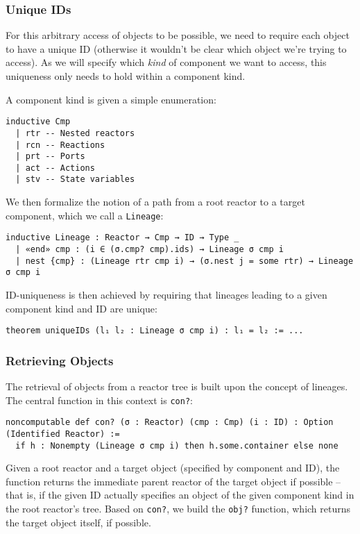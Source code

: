 \subsubsection{Unique IDs}

For this arbitrary access of objects to be possible, we need to require each object to have a unique ID (otherwise it wouldn't be clear which object we're trying to access).
As we will specify which \emph{kind} of component we want to access, this uniqueness only needs to hold within a component kind.

A component kind is given a simple enumeration:

\begin{lstlisting}
inductive Cmp
  | rtr -- Nested reactors
  | rcn -- Reactions
  | prt -- Ports
  | act -- Actions
  | stv -- State variables
\end{lstlisting}

We then formalize the notion of a path from a root reactor to a target component, which we call a \lstinline{Lineage}:

\begin{lstlisting}
inductive Lineage : Reactor → Cmp → ID → Type _
  | «end» cmp : (i ∈ (σ.cmp? cmp).ids) → Lineage σ cmp i
  | nest {cmp} : (Lineage rtr cmp i) → (σ.nest j = some rtr) → Lineage σ cmp i
\end{lstlisting}

ID-uniqueness is then achieved by requiring that lineages leading to a given component kind and ID are unique:

\begin{lstlisting}
theorem uniqueIDs (l₁ l₂ : Lineage σ cmp i) : l₁ = l₂ := ...
\end{lstlisting}

\subsubsection{Retrieving Objects}

The retrieval of objects from a reactor tree is built upon the concept of lineages.
The central function in this context is \lstinline{con?}:

\begin{lstlisting}
noncomputable def con? (σ : Reactor) (cmp : Cmp) (i : ID) : Option (Identified Reactor) := 
  if h : Nonempty (Lineage σ cmp i) then h.some.container else none
\end{lstlisting}

Given a root reactor and a target object (specified by component and ID), the function returns the immediate parent reactor of the target object if possible -- that is, if the given ID actually specifies an object of the given component kind in the root reactor's tree.
Based on \lstinline{con?}, we build the \lstinline{obj?} function, which returns the target object itself, if possible.

